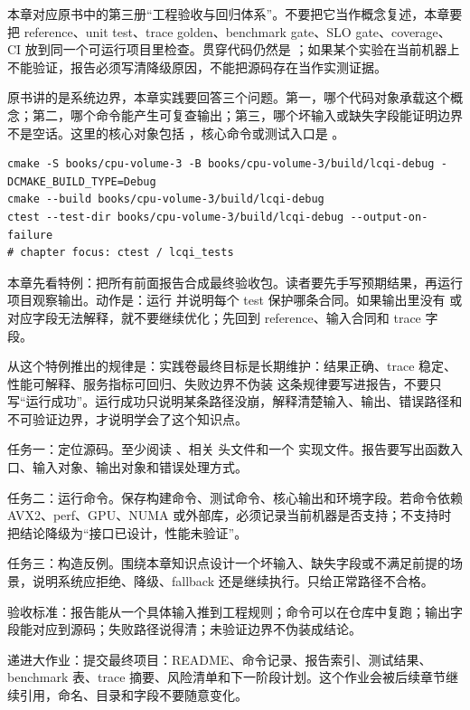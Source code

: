 
本章对应原书中的第三册“工程验收与回归体系”。不要把它当作概念复述，本章要把 reference、unit test、trace golden、benchmark gate、SLO gate、coverage、CI 放到同一个可运行项目里检查。贯穿代码仍然是 ；如果某个实验在当前机器上不能验证，报告必须写清降级原因，不能把源码存在当作实测证据。


原书讲的是系统边界，本章实践要回答三个问题。第一，哪个代码对象承载这个概念；第二，哪个命令能产生可复查输出；第三，哪个坏输入或缺失字段能证明边界不是空话。这里的核心对象包括 ，核心命令或测试入口是 。

\begin{lstlisting}[numbers=none,caption={第 16 章实践：工程验收、回归门禁与最终项目 的最小命令入口}]
cmake -S books/cpu-volume-3 -B books/cpu-volume-3/build/lcqi-debug -DCMAKE_BUILD_TYPE=Debug
cmake --build books/cpu-volume-3/build/lcqi-debug
ctest --test-dir books/cpu-volume-3/build/lcqi-debug --output-on-failure
# chapter focus: ctest / lcqi_tests
\end{lstlisting}


本章先看特例：把所有前面报告合成最终验收包。读者要先手写预期结果，再运行项目观察输出。动作是：运行  并说明每个 test 保护哪条合同。如果输出里没有  或对应字段无法解释，就不要继续优化；先回到 reference、输入合同和 trace 字段。

从这个特例推出的规律是：实践卷最终目标是长期维护：结果正确、trace 稳定、性能可解释、服务指标可回归、失败边界不伪装 这条规律要写进报告，不要只写“运行成功”。运行成功只说明某条路径没崩，解释清楚输入、输出、错误路径和不可验证边界，才说明学会了这个知识点。


任务一：定位源码。至少阅读 、相关  头文件和一个  实现文件。报告要写出函数入口、输入对象、输出对象和错误处理方式。

任务二：运行命令。保存构建命令、测试命令、核心输出和环境字段。若命令依赖 AVX2、perf、GPU、NUMA 或外部库，必须记录当前机器是否支持；不支持时把结论降级为“接口已设计，性能未验证”。

任务三：构造反例。围绕本章知识点设计一个坏输入、缺失字段或不满足前提的场景，说明系统应拒绝、降级、fallback 还是继续执行。只给正常路径不合格。


验收标准：报告能从一个具体输入推到工程规则；命令可以在仓库中复跑；输出字段能对应到源码；失败路径说得清；未验证边界不伪装成结论。

递进大作业：提交最终项目：README、命令记录、报告索引、测试结果、benchmark 表、trace 摘要、风险清单和下一阶段计划。这个作业会被后续章节继续引用，命名、目录和字段不要随意变化。
